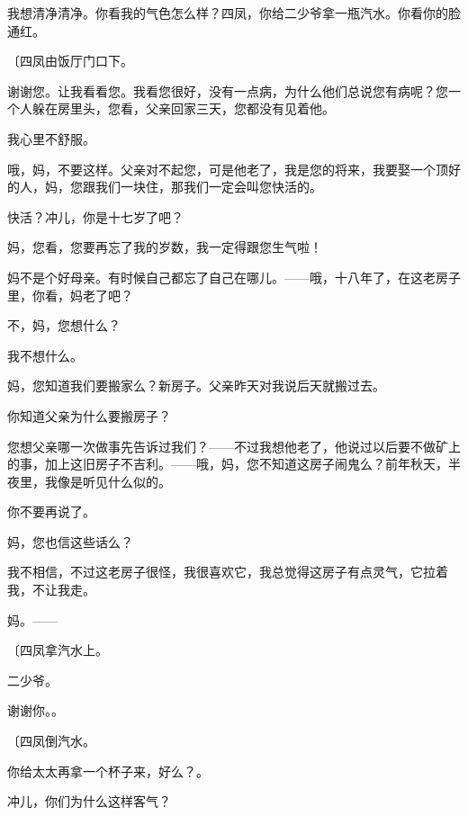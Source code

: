 我想清净清净。你看我的气色怎么样？四凤，你给二少爷拿一瓶汽水。你看你的脸通红。

{\fangsong〔四凤由饭厅门口下。}

谢谢您。让我看看您。我看您很好，没有一点病，为什么他们总说您有病呢？您一个人躲在房里头，您看，父亲回家三天，您都没有见着他。

我心里不舒服。

哦，妈，不要这样。父亲对不起您，可是他老了，我是您的将来，我要娶一个顶好的人，妈，您跟我们一块住，那我们一定会叫您快活的。

快活？冲儿，你是十七岁了吧？

妈，您看，您要再忘了我的岁数，我一定得跟您生气啦！

妈不是个好母亲。有时候自己都忘了自己在哪儿。——哦，十八年了，在这老房子里，你看，妈老了吧？

不，妈，您想什么？

我不想什么。

妈，您知道我们要搬家么？新房子。父亲昨天对我说后天就搬过去。

你知道父亲为什么要搬房子？

您想父亲哪一次做事先告诉过我们？——不过我想他老了，他说过以后要不做矿上的事，加上这旧房子不吉利。——哦，妈，您不知道这房子闹鬼么？前年秋天，半夜里，我像是听见什么似的。

你不要再说了。

妈，您也信这些话么？

我不相信，不过这老房子很怪，我很喜欢它，我总觉得这房子有点灵气，它拉着我，不让我走。

妈。——

{\fangsong〔四凤拿汽水上。}

二少爷。

谢谢你。。

{\fangsong〔四凤倒汽水。}

你给太太再拿一个杯子来，好么？。

冲儿，你们为什么这样客气？

